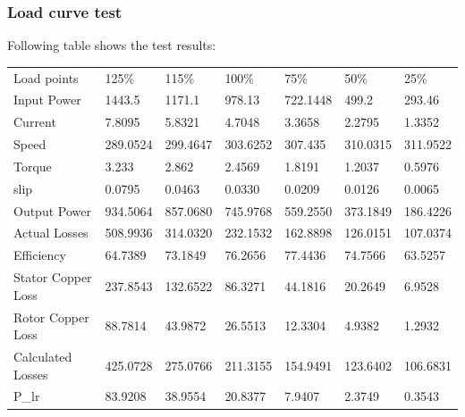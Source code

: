 \subsubsection{Load curve test}
Following table shows the test results:
\begin{table}[hbtp!]
\begin{tabular}{lllllll}
    \rowcolor[HTML]{343434} 
    Load   points                                & 125\%    & 115\%    & 100\%    & 75\%     & 50\%     & 25\%     \\
    \rowcolor[HTML]{F2F2F2} 
    \cellcolor[HTML]{656565}Input   Power        & 1443.5   & 1171.1   & 978.13   & 722.1448 & 499.2    & 293.46   \\
    \cellcolor[HTML]{656565}Current              & 7.8095   & 5.8321   & 4.7048   & 3.3658   & 2.2795   & 1.3352   \\
    \rowcolor[HTML]{F2F2F2} 
    \cellcolor[HTML]{656565}Speed                & 289.0524 & 299.4647 & 303.6252 & 307.435  & 310.0315 & 311.9522 \\
    \cellcolor[HTML]{656565}Torque               & 3.233    & 2.862    & 2.4569   & 1.8191   & 1.2037   & 0.5976   \\
    \rowcolor[HTML]{F2F2F2} 
    \cellcolor[HTML]{656565}slip                 & 0.0795   & 0.0463   & 0.0330   & 0.0209   & 0.0126   & 0.0065   \\
    \cellcolor[HTML]{656565}Output   Power       & 934.5064 & 857.0680 & 745.9768 & 559.2550 & 373.1849 & 186.4226 \\
    \rowcolor[HTML]{F2F2F2} 
    \cellcolor[HTML]{656565}Actual   Losses      & 508.9936 & 314.0320 & 232.1532 & 162.8898 & 126.0151 & 107.0374 \\
    \cellcolor[HTML]{656565}Efficiency           & 64.7389  & 73.1849  & 76.2656  & 77.4436  & 74.7566  & 63.5257  \\
    \rowcolor[HTML]{F2F2F2} 
    \cellcolor[HTML]{656565}Stator   Copper Loss & 237.8543 & 132.6522 & 86.3271  & 44.1816  & 20.2649  & 6.9528   \\
    \cellcolor[HTML]{656565}Rotor   Copper Loss  & 88.7814  & 43.9872  & 26.5513  & 12.3304  & 4.9382   & 1.2932   \\
    \rowcolor[HTML]{F2F2F2} 
    \cellcolor[HTML]{656565}Calculated   Losses  & 425.0728 & 275.0766 & 211.3155 & 154.9491 & 123.6402 & 106.6831 \\
    \cellcolor[HTML]{656565}P\_lr                & 83.9208  & 38.9554  & 20.8377  & 7.9407   & 2.3749   & 0.3543   
\end{tabular}
\end{table}

